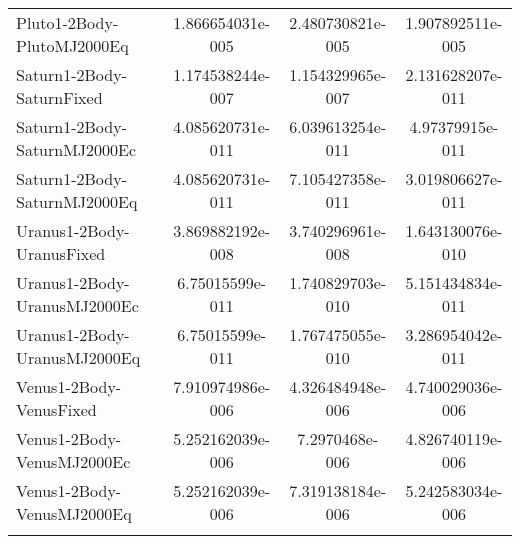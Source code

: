\begin{table}[htbp!]
\begin{tabular}{lccc}
         Pluto1-2Body-PlutoMJ2000Eq & 1.866654031e-005 & 2.480730821e-005 & 1.907892511e-005 \\
         Saturn1-2Body-SaturnFixed & 1.174538244e-007 & 1.154329965e-007 & 2.131628207e-011 \\
         Saturn1-2Body-SaturnMJ2000Ec & 4.085620731e-011 & 6.039613254e-011 & 4.97379915e-011 \\
         Saturn1-2Body-SaturnMJ2000Eq & 4.085620731e-011 & 7.105427358e-011 & 3.019806627e-011 \\
         Uranus1-2Body-UranusFixed & 3.869882192e-008 & 3.740296961e-008 & 1.643130076e-010 \\
         Uranus1-2Body-UranusMJ2000Ec & 6.75015599e-011 & 1.740829703e-010 & 5.151434834e-011 \\
         Uranus1-2Body-UranusMJ2000Eq & 6.75015599e-011 & 1.767475055e-010 & 3.286954042e-011 \\
         Venus1-2Body-VenusFixed & 7.910974986e-006 & 4.326484948e-006 & 4.740029036e-006 \\
         Venus1-2Body-VenusMJ2000Ec & 5.252162039e-006 & 7.2970468e-006 & 4.826740119e-006 \\
         Venus1-2Body-VenusMJ2000Eq & 5.252162039e-006 & 7.319138184e-006 & 5.242583034e-006 \\
      \hline\hline
      \label{Table: LinuxGMAT-MacGMAT CS Parameters Set 2} 
\end{tabular}
\end{table}
